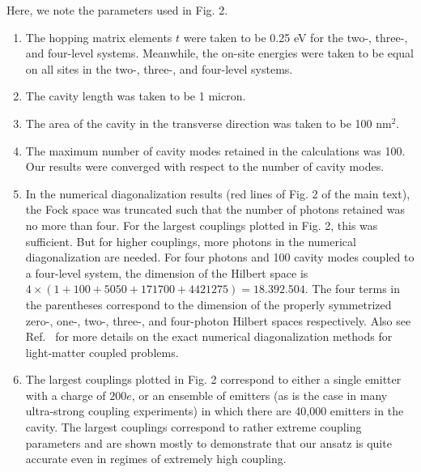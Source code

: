 \documentclass[aps,prb,onecolumn,preprint,
	groupedaddress,superscriptaddress,
	amsfonts,amssymb,amsmath,floatfix,
	citeautoscript]{revtex4-1}
\begin{document}
Here, we note the parameters used in Fig. 2.
\begin{enumerate}
\item{The hopping matrix elements $t$ were taken to be 0.25 eV for the two-, three-, and four-level systems. Meanwhile, the on-site energies were taken to be equal on all sites in the two-, three-, and four-level systems.}
\item{The cavity length was taken to be 1 micron.}
\item{The area of the cavity in the transverse direction was taken to be 100 nm$^2$.}
\item{The maximum number of cavity modes retained in the calculations was 100. Our results were converged with respect to the number of cavity modes.}
\item{In the numerical diagonalization results (red lines of Fig. 2 of the main text), the Fock space was truncated such that the number of photons retained was no more than four. For the largest couplings plotted in Fig. 2, this was sufficient. But for higher couplings, more photons in the numerical diagonalization are needed. For four photons and 100 cavity modes coupled to a four-level system, the dimension of the Hilbert space is  $4\times \left( 1 + 100 + 5050 + 171700 + 4421275 \right) = 18.392.504$. The four terms in the parentheses correspond to the dimension of the properly symmetrized zero-, one-, two-, three-, and four-photon Hilbert spaces respectively. Also see Ref.~\cite{flick2017} for more details on the exact numerical diagonalization methods for light-matter coupled problems.}
\item{The largest couplings plotted in Fig. 2 correspond to either a single emitter with a charge of $200e$, or an ensemble of emitters (as is the case in many ultra-strong coupling experiments) in which there are 40,000 emitters in the cavity. The largest couplings correspond to rather extreme coupling parameters and are shown mostly to demonstrate that our ansatz is quite accurate even in regimes of extremely high coupling.}
\end{enumerate}



\end{document}
